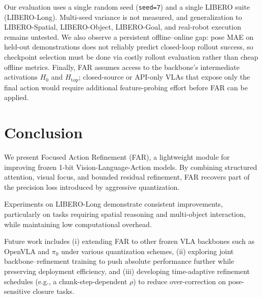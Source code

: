 \documentclass[conference]{IEEEtran}
\begin{document}
Our evaluation uses a single random seed (\texttt{seed=7}) and a single LIBERO suite (LIBERO-Long). Multi-seed variance is not measured, and generalization to LIBERO-Spatial, LIBERO-Object, LIBERO-Goal, and real-robot execution remains untested. We also observe a persistent offline--online gap: pose MAE on held-out demonstrations does not reliably predict closed-loop rollout success, so checkpoint selection must be done via costly rollout evaluation rather than cheap offline metrics. Finally, FAR assumes access to the backbone's intermediate activations $H_0$ and $H_{\text{top}}$; closed-source or API-only VLAs that expose only the final action would require additional feature-probing effort before FAR can be applied.

\section{Conclusion}

We present Focused Action Refinement (FAR), a lightweight module for improving frozen 1-bit Vision-Language-Action models. By combining structured attention, visual focus, and bounded residual refinement, FAR recovers part of the precision loss introduced by aggressive quantization.

Experiments on LIBERO-Long demonstrate consistent improvements, particularly on tasks requiring spatial reasoning and multi-object interaction, while maintaining low computational overhead.

Future work includes (i) extending FAR to other frozen VLA backbones such as OpenVLA and $\pi_0$ under various quantization schemes, (ii) exploring joint backbone--refinement training to push absolute performance further while preserving deployment efficiency, and (iii) developing time-adaptive refinement schedules (e.g., a chunk-step-dependent $\rho$) to reduce over-correction on pose-sensitive closure tasks.




\end{document}
